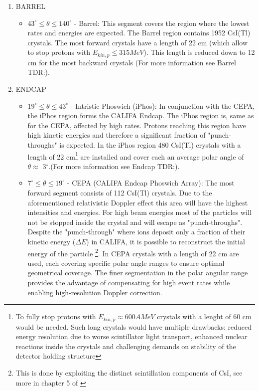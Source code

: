 \begin{enumerate}
\item BARREL
\begin{itemize}
\item[\ding{108}] $43^{\circ} \leq \theta \leq 140^{\circ}$ - Barrel: This segment covers the region where the lowest rates and energies are expected. The Barrel region contains 1952 CsI(Tl) crystals. The most forward crystals have a length of 22 cm (which allow to stop protons with $E_{kin,p} \leq 315 MeV$). This length is reduced down to 12 cm for the most backward crystals (For more information see Barrel TDR:\cite{tdr:barrel}).   
\end{itemize}
\item ENDCAP
\begin{itemize}
\item[\ding{108}] $19^{\circ} \leq \theta \leq 43^{\circ}$ - Intristic Phoswich (iPhos): In conjunction with the CEPA, the iPhos region forms the CALIFA Endcap. The iPhos region is, same as for the CEPA, affected by high rates. Protons reaching this region have high kinetic energies and therefore a significant fraction of "punch-throughs" is expected. In the iPhos region 480 CsI(Tl) crystals with a length of 22 cm\footnote{To fully stop protons with $E_{kin,p} \approx 600 AMeV$ crystals with a lenght of 60 cm would be needed. Such long crystals would have multiple drawbacks: reduced energy resolution due to worse scintillator light transport, enhanced nuclear reactions inside the crystals and challenging demands on stability of the detector holding structure} are installed and cover each an average polar angle of $\theta \approx$ 3$^{\circ}$.(For more information see Endcap TDR:\cite{tdr:endcap}).
\item[\ding{108}] $7^{\circ} \leq \theta \leq 19^{\circ}$ - CEPA (CALIFA Endcap Phoswich Array): The most forward segment consists of 112 CsI(Tl) crystals. Due to the aforementioned relativistic Doppler effect this area will have the highest intensities and energies. For high beam energies most of the particles will not be stopped inside the crystal and will escape as "punch-throughs". Despite the "punch-through" where ions deposit only a fraction of their kinetic energy ($\Delta E$) in CALIFA, it is possible to reconstruct the initial energy of the particle \footnote{This is done by exploiting the distinct scintillation components of CsI, see more in chapter 5 of \cite{Bendel:98055}}. In CEPA crystals with a length of 22 cm are used, each covering specific polar angle ranges to ensure optimal geometrical coverage. The finer segmentation in the polar angular range provides the advantage of compensating for high event rates while enabling high-resolution Doppler correction.      
\end{itemize}


\end{enumerate}
